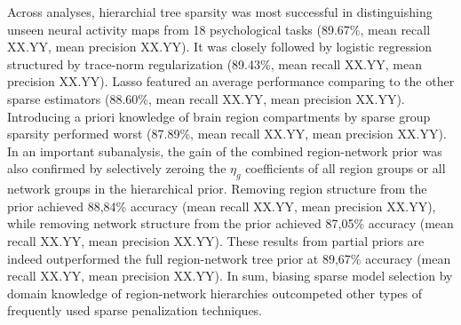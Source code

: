 \documentclass{article} %
\begin{document}
Across analyses,
hierarchial tree sparsity was most successful
in distinguishing unseen neural activity maps from 18 psychological tasks
(89.67\%, mean recall XX.YY, mean precision XX.YY).
It was closely followed by logistic regression
structured by trace-norm regularization
(89.43\%, mean recall XX.YY, mean precision XX.YY).
Lasso featured an average performance comparing to the other sparse estimators
(88.60\%, mean recall XX.YY, mean precision XX.YY).
Introducing a priori knowledge of brain region compartments
by sparse group sparsity performed worst
(87.89\%, mean recall XX.YY, mean precision XX.YY).
%
In an important subanalysis,
the gain of the combined region-network prior was also confirmed by
selectively zeroing the $\eta_g$ coefficients of all region groups
or all network groups in the hierarchical prior.
Removing region structure from the prior achieved
88,84\% accuracy (mean recall XX.YY, mean precision XX.YY),
while removing network structure from the prior achieved
87,05\% accuracy (mean recall XX.YY, mean precision XX.YY).
These results from partial priors are indeed outperformed
the full region-network tree prior at 89,67\% accuracy
(mean recall XX.YY, mean precision XX.YY).
%
In sum,
biasing sparse model selection by domain knowledge of region-network hierarchies
outcompeted other types of frequently used sparse penalization techniques.
\end{document}
